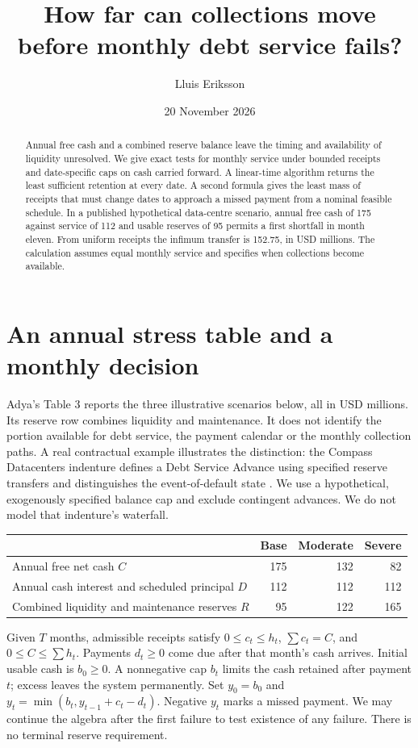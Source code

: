 \documentclass[11pt]{article}
\title{How far can collections move before monthly debt service fails?}
\author{Lluis Eriksson}\date{20 November 2026}
\begin{document}
\maketitle
\begin{abstract}
Annual free cash and a combined reserve balance leave the timing and availability of liquidity unresolved. We give exact tests for monthly service under bounded receipts and date-specific caps on cash carried forward. A linear-time algorithm returns the least sufficient retention at every date. A second formula gives the least mass of receipts that must change dates to approach a missed payment from a nominal feasible schedule. In a published hypothetical data-centre scenario, annual free cash of 175 against service of 112 and usable reserves of 95 permits a first shortfall in month eleven. From uniform receipts the infimum transfer is 152.75, in USD millions. The calculation assumes equal monthly service and specifies when collections become available.
\end{abstract}
\section{An annual stress table and a monthly decision}
Adya's Table 3 \cite{adya} reports the three illustrative scenarios below, all in USD millions. Its reserve row combines liquidity and maintenance. It does not identify the portion available for debt service, the payment calendar or the monthly collection paths. A real contractual example illustrates the distinction: the Compass Datacenters indenture defines a Debt Service Advance using specified reserve transfers and distinguishes the event-of-default state \cite{indenture}. We use a hypothetical, exogenously specified balance cap and exclude contingent advances. We do not model that indenture's waterfall.
\begin{center}
\begin{tabular}{lrrr}\toprule
 & Base & Moderate & Severe\\ \midrule
Annual free net cash $C$&175&132&82\\
Annual cash interest and scheduled principal $D$&112&112&112\\
Combined liquidity and maintenance reserves $R$&95&122&165\\ \bottomrule
\end{tabular}
\end{center}
Given $T$ months, admissible receipts satisfy $0\le c_t\le h_t$, $\sum c_t=C$, and $0\le C\le\sum h_t$. Payments $d_t\ge0$ come due after that month's cash arrives. Initial usable cash is $b_0\ge0$. A nonnegative cap $b_t$ limits the cash retained after payment $t$; excess leaves the system permanently. Set $y_0=b_0$ and $y_t=\min(b_t,y_{t-1}+c_t-d_t)$. Negative $y_t$ marks a missed payment. We may continue the algebra after the first failure to test existence of any failure. There is no terminal reserve requirement.
\end{document}

